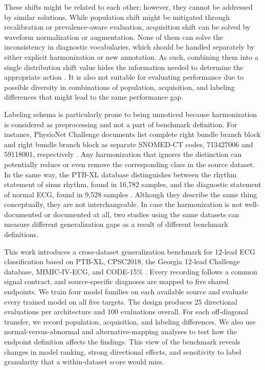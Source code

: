 \documentclass[conference]{IEEEtran}
\begin{document}
These shifts might be related to each other; however, they cannot be addressed by similar solutions. While population shift might be mitigated through recalibration or prevalence-aware evaluation, acquisition shift can be solved by waveform normalization or augmentation. None of them can solve the inconsistency in diagnostic vocabularies, which should be handled separately by either explicit harmonization or new annotation. As such, combining them into a single distribution shift value hides the information needed to determine the appropriate action \cite{subbaswamy2020}. It is also not suitable for evaluating performance due to possible diversity in combinations of population, acquisition, and labeling differences that might lead to the same performance gap.

Labeling schema is particularly prone to being unnoticed because harmonization is considered as preprocessing and not a part of benchmark definition. For instance, PhysioNet Challenge documents list complete right bundle branch block and right bundle branch block as separate SNOMED-CT codes, 713427006 and 59118001, respectively \cite{alday2020}. Any harmonization that ignores the distinction can potentially reduce or even remove the corresponding class in the source dataset. In the same way, the PTB-XL database distinguishes between the rhythm statement of sinus rhythm, found in 16,782 samples, and the diagnostic statement of normal ECG, found in 9,528 samples \cite{wagner2020}. Although they describe the same thing conceptually, they are not interchangeable. In case the harmonization is not well-documented or documented at all, two studies using the same datasets can measure different generalization gaps as a result of different benchmark definitions.

This work introduces a cross-dataset generalization benchmark for 12-lead ECG classification based on PTB-XL, CPSC2018, the Georgia 12-lead Challenge database, MIMIC-IV-ECG, and CODE-15\% \cite{wagner2020,alday2020,gow2023,code15}. Every recording follows a common signal contract, and source-specific diagnoses are mapped to five shared endpoints. We train four model families on each available source and evaluate every trained model on all five targets. The design produces 25 directional evaluations per architecture and 100 evaluations overall. For each off-diagonal transfer, we record population, acquisition, and labeling differences. We also use normal-versus-abnormal and alternative-mapping analyses to test how the endpoint definition affects the findings. This view of the benchmark reveals changes in model ranking, strong directional effects, and sensitivity to label granularity that a within-dataset score would miss.
\end{document}
